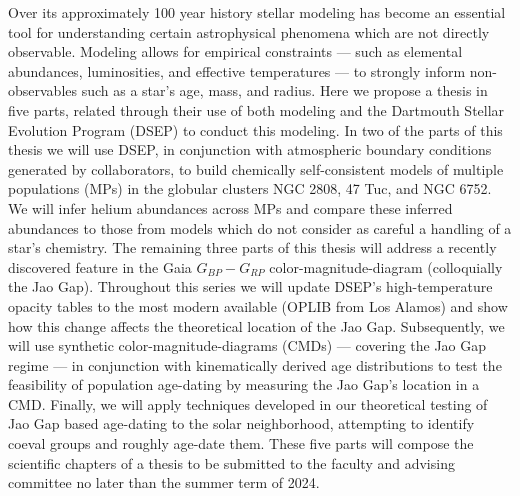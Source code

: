 Over its approximately 100 year history stellar modeling has become an
essential tool for understanding certain astrophysical phenomena which are not
directly observable. Modeling allows for empirical constraints --- such as
elemental abundances, luminosities, and effective temperatures --- to strongly
inform non-observables such as a star's age, mass, and radius. Here we propose a
thesis in five parts, related through their use of both modeling and the
Dartmouth Stellar Evolution Program (DSEP) to conduct this modeling. In two of
the parts of this thesis we will use DSEP, in conjunction with atmospheric
boundary conditions generated by collaborators, to build chemically
self-consistent models of multiple populations (MPs) in the globular clusters
NGC 2808, 47 Tuc, and NGC 6752. We will infer helium abundances across MPs and
compare these inferred abundances to those from models which do not consider as
careful a handling of a star's chemistry. The remaining three parts of this
thesis will address a recently discovered feature in the Gaia $G_{BP} - G_{RP}$
color-magnitude-diagram (colloquially the Jao Gap). Throughout this series we
will update DSEP's high-temperature opacity tables to the most modern available
(OPLIB from Los Alamos) and show how this change affects the theoretical
location of the Jao Gap. Subsequently, we will use synthetic
color-magnitude-diagrams (CMDs) --- covering the Jao Gap regime --- in
conjunction with kinematically derived age distributions to test the
feasibility of population age-dating by measuring the Jao Gap's location in a
CMD. Finally, we will apply techniques developed in our theoretical testing of
Jao Gap based age-dating to the solar neighborhood, attempting to identify
coeval groups and roughly age-date them. These five parts will compose the
scientific chapters of a thesis to be submitted to the faculty and advising
committee no later than the summer term of 2024.
